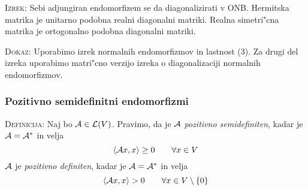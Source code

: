 \textsc{Izrek:} Sebi adjungiran endomorfizem se da diagonalizirati v ONB. Hermitska matrika je unitarno podobna realni diagonalni matriki. Realna simetri"cna matrika je ortogonalno podobna diagonalni matriki.

\textsc{Dokaz:}
Uporabimo izrek normalnih endomorfizmov in lastnost (3). Za drugi del izreka uporabimo matri"cno verzijo izreka o diagonalizaciji normalnih endomorfizmov.

\subsubsection{Pozitivno semidefinitni endomorfizmi}
\textsc{Definicija:} Naj bo $\mathcal{A} \in \mathcal{L}(V)$. Pravimo, da je $\mathcal{A}$ \emph{pozitivno semidefiniten}, kadar je $\mathcal{A} = \mathcal{A}^*$ in velja
\begin{equation*}
\langle \mathcal{A} x, x \rangle \geq 0 \qquad \forall x \in V
\end{equation*}
$\mathcal{A}$ je \emph{pozitivno definiten}, kadar je $\mathcal{A} = \mathcal{A}^*$ in velja
\begin{equation*}
\langle \mathcal{A} x, x \rangle > 0 \qquad \forall x \in V \setminus \{ 0 \}
\end{equation*}

